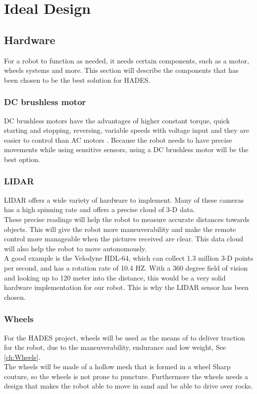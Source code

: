 \chapter{Ideal Design}\label{ch:Implementation Theory}

\section{Hardware}
For a robot to function as needed, it needs certain components, such as a motor, wheels systems and more. This section will describe the components that has been chosen to be the best solution for HADES.

\subsection{DC brushless motor}
DC brushless motors have the advantages of higher constant torque, quick starting and stopping, reversing, variable speeds with voltage input and they are easier to control than AC motors . Because the robot needs to have precise movements while using sensitive sensors, using a DC brushless motor will be the best option.

\subsection{LIDAR}
LIDAR offers a wide variety of hardware to implement. Many of these cameras has a high spinning rate and offers a precise cloud of 3-D data.\\
These precise readings will help the robot to measure accurate distances towards objects. This will give the robot more maneuverability and make the remote control more manageable when the pictures received are clear. This data cloud will also help the robot to move autonomously.\\
A good example is the Velodyne HDL-64, which can collect 1.3 million 3-D points per second, and has a rotation rate of 10.4 HZ. With a 360 degree field of vision and looking up to 120 meter into the distance, this would be a very solid hardware implementation for our robot. \cite{Lidar360}
This is why the LIDAR sensor has been chosen. 


\subsection{Wheels}
For the HADES project, wheels will be used as the means of to deliver traction for the robot, due to the maneuverability, endurance and low weight, See \ref{ch:Wheels}.\\
The wheels will be made of a hollow mesh that is formed in a wheel Sharp couture, so the wheels is not prone to puncture. Furthermore the wheels needs a design that makes the robot able to move in sand and be able to drive over rocks.  

